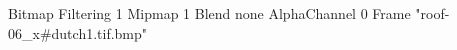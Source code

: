 {Bitmap
	{Filtering 1}
	{Mipmap 1}
	{Blend none}
	{AlphaChannel 0}
	{Frame "roof-06_x#dutch1.tif.bmp"}
}
